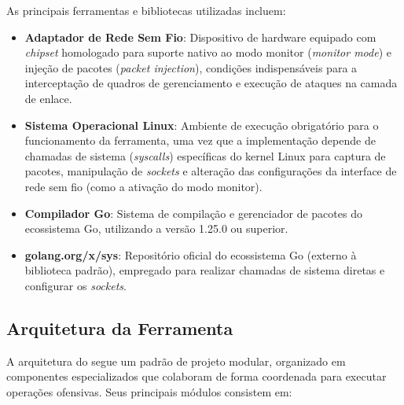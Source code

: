 As principais ferramentas e bibliotecas utilizadas incluem:
\begin{itemize}
    \item \textbf{Adaptador de Rede Sem Fio}: Dispositivo de hardware equipado com \textit{chipset} homologado para suporte nativo ao modo monitor (\textit{monitor mode}) e injeção de pacotes (\textit{packet injection}), condições indispensáveis para a interceptação de quadros de gerenciamento e execução de ataques na camada de enlace.

    \item \textbf{Sistema Operacional Linux}: Ambiente de execução obrigatório para o funcionamento da ferramenta, uma vez que a implementação depende de chamadas de sistema (\textit{syscalls}) específicas do kernel Linux para captura de pacotes, manipulação de \textit{sockets} e alteração das configurações da interface de rede sem fio (como a ativação do modo monitor).
    
    \item \textbf{Compilador Go}: Sistema de compilação e gerenciador de pacotes do ecossistema Go, utilizando a versão 1.25.0 ou superior.
    
    \item \textbf{golang.org/x/sys}: Repositório oficial do ecossistema Go (externo à biblioteca padrão), empregado para realizar chamadas de sistema diretas e configurar os \textit{sockets}.
\end{itemize}

\subsection{Arquitetura da Ferramenta}
A arquitetura do \offscan segue um padrão de projeto modular, organizado em componentes especializados que colaboram de forma coordenada para executar operações ofensivas. Seus principais módulos consistem em:

